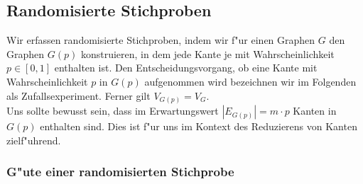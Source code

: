 \subsection{Randomisierte Stichproben}

Wir erfassen randomisierte Stichproben, indem wir f"ur einen Graphen $G$ den
    Graphen $G(p)$ konstruieren, in dem jede Kante je mit Wahrscheinlichkeit 
    $p \in [0,1]$ enthalten ist. 
    Den Entscheidungsvorgang, ob eine Kante mit Wahrscheinlichkeit $p$
    in $G(p)$ aufgenommen wird bezeichnen wir im Folgenden als Zufallsexperiment.
    Ferner gilt $V_{G(p)} = V_G$.\\
Uns sollte bewusst sein, dass im Erwartungswert $|E_{G(p)}| = m \cdot p$ Kanten
    in $G(p)$ enthalten sind.
    Dies ist f"ur uns im Kontext des Reduzierens von Kanten zielf"uhrend.\\

\subsubsection{G"ute einer randomisierten Stichprobe}
\label{sec:goodnessRand}

